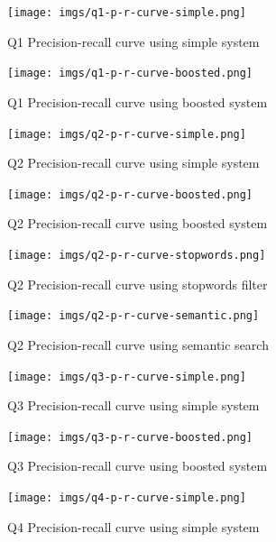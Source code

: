 \documentclass[sigconf]{acmart}
\begin{document}
\begin{figure}[H]
  \centering
  \texttt{[image: imgs/q1-p-r-curve-simple.png]}
  \caption{Q1 Precision-recall curve using simple system}
  \label{fig:q1_simple}
\end{figure}

\begin{figure}[H]
  \centering
  \texttt{[image: imgs/q1-p-r-curve-boosted.png]}
  \caption{Q1 Precision-recall curve using boosted system}
  \label{fig:q1_boosted}
\end{figure}


\begin{figure}[H]
  \centering
  \texttt{[image: imgs/q2-p-r-curve-simple.png]}
  \caption{Q2 Precision-recall curve using simple system}
  \label{fig:q2_simple}
\end{figure}

\begin{figure}[H]
  \centering
  \texttt{[image: imgs/q2-p-r-curve-boosted.png]}
  \caption{Q2 Precision-recall curve using boosted system}
  \label{fig:q2_boosted}
\end{figure}

\begin{figure}[H]
  \centering
  \texttt{[image: imgs/q2-p-r-curve-stopwords.png]}
  \caption{Q2 Precision-recall curve using stopwords filter}
  \label{fig:q2_stopwords}
\end{figure}

\begin{figure}[H]
  \centering
  \texttt{[image: imgs/q2-p-r-curve-semantic.png]}
  \caption{Q2 Precision-recall curve using semantic search}
  \label{fig:q2_semantic}
\end{figure}


\begin{figure}[H]
  \centering
  \texttt{[image: imgs/q3-p-r-curve-simple.png]}
  \caption{Q3 Precision-recall curve using simple system}
  \label{fig:q3_simple}
\end{figure}

\begin{figure}[H]
  \centering
  \texttt{[image: imgs/q3-p-r-curve-boosted.png]}
  \caption{Q3 Precision-recall curve using boosted system}
  \label{fig:q3_boosted}
\end{figure}

\begin{figure}[H]
  \centering
  \texttt{[image: imgs/q4-p-r-curve-simple.png]}
  \caption{Q4 Precision-recall curve using simple system}
  \label{fig:q4_simple}
\end{figure}
\end{document}
